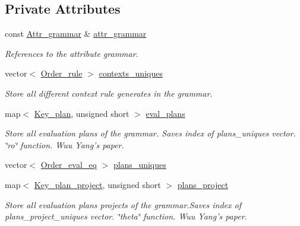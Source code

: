 \subsection*{Private Attributes}
\begin{CompactItemize}
\item 
const \hyperlink{classgenevalmag_1_1Attr__grammar}{Attr\_\-grammar} \& \hyperlink{classgenevalmag_1_1Builder__plans_247759aafc18133de19c8c95afb9c2d5}{attr\_\-grammar}
\begin{CompactList}\small\item\em References to the attribute grammar. \item\end{CompactList}\item 
vector$<$ \hyperlink{namespacegenevalmag_ed20da32fb9692645ae53d911d274fd5}{Order\_\-rule} $>$ \hyperlink{classgenevalmag_1_1Builder__plans_ac38711883bb0acd21483d2a918e0f0d}{contexts\_\-uniques}
\begin{CompactList}\small\item\em Store all different context rule generates in the grammar. \item\end{CompactList}\item 
map$<$ \hyperlink{structgenevalmag_1_1k__plan}{Key\_\-plan}, unsigned short $>$ \hyperlink{classgenevalmag_1_1Builder__plans_02c97bab7b3561f4dde009b974255dfe}{eval\_\-plans}
\begin{CompactList}\small\item\em Store all evaluation plans of the grammar. Saves index of plans\_\-uniques vector. \char`\"{}ro\char`\"{} function. Wuu Yang's paper. \item\end{CompactList}\item 
vector$<$ \hyperlink{namespacegenevalmag_0bb2e8b0fa1b07b873f0363719de7b64}{Order\_\-eval\_\-eq} $>$ \hyperlink{classgenevalmag_1_1Builder__plans_9cb3fc77b164a22cf37a0ec3e8f78bf7}{plans\_\-uniques}
\item 
map$<$ \hyperlink{structgenevalmag_1_1k__p__project}{Key\_\-plan\_\-project}, unsigned short $>$ \hyperlink{classgenevalmag_1_1Builder__plans_b353b4b6e3b9c72a8fb61ee376a4f76c}{plans\_\-project}
\begin{CompactList}\small\item\em Store all evaluation plans projects of the grammar.Saves index of plans\_\-project\_\-uniques vector. \char`\"{}theta\char`\"{} function. Wuu Yang's paper. \item\end{CompactList}\item 

\end{CompactItemize}
